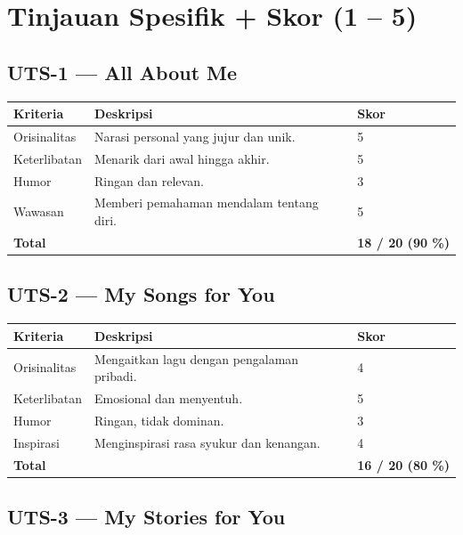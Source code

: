 \documentclass[
  letterpaper,
  DIV=11,
  numbers=noendperiod]{scrreprt}
\begin{document}
\section{Tinjauan Spesifik + Skor (1 --
5)}\label{tinjauan-spesifik-skor-1-5}

\subsection{\texorpdfstring{\textbf{UTS-1 --- All About
Me}}{UTS-1 --- All About Me}}\label{uts-1-all-about-me-1}

\begin{longtable}[]{@{}lll@{}}
\toprule\noalign{}
Kriteria & Deskripsi & Skor \\
\midrule\noalign{}
\endhead
\bottomrule\noalign{}
\endlastfoot
Orisinalitas & Narasi personal yang jujur dan unik. & 5 \\
Keterlibatan & Menarik dari awal hingga akhir. & 5 \\
Humor & Ringan dan relevan. & 3 \\
Wawasan & Memberi pemahaman mendalam tentang diri. & 5 \\
\textbf{Total} & & \textbf{18 / 20 (90 \%)} \\
\end{longtable}

\subsection{\texorpdfstring{\textbf{UTS-2 --- My Songs for
You}}{UTS-2 --- My Songs for You}}\label{uts-2-my-songs-for-you-1}

\begin{longtable}[]{@{}lll@{}}
\toprule\noalign{}
Kriteria & Deskripsi & Skor \\
\midrule\noalign{}
\endhead
\bottomrule\noalign{}
\endlastfoot
Orisinalitas & Mengaitkan lagu dengan pengalaman pribadi. & 4 \\
Keterlibatan & Emosional dan menyentuh. & 5 \\
Humor & Ringan, tidak dominan. & 3 \\
Inspirasi & Menginspirasi rasa syukur dan kenangan. & 4 \\
\textbf{Total} & & \textbf{16 / 20 (80 \%)} \\
\end{longtable}

\subsection{\texorpdfstring{\textbf{UTS-3 --- My Stories for
You}}{UTS-3 --- My Stories for You}}\label{uts-3-my-stories-for-you-1}
\end{document}
